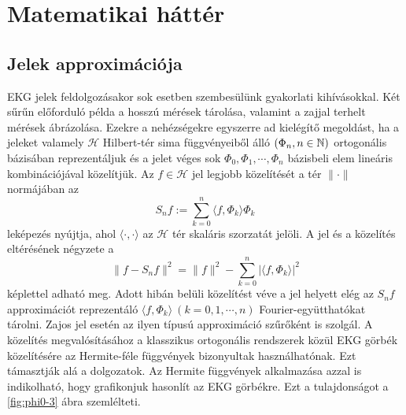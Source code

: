 \documentclass[oneside,titlepage,12pt,a4paper]{report}
\begin{document}
\section{Matematikai háttér}
\subsection{Jelek approximációja}

EKG jelek feldolgozásakor sok esetben szembesülünk gyakorlati kihívásokkal. Két sűrűn előforduló példa a hosszú mérések tárolása, valamint a zajjal terhelt mérések ábrázolása. Ezekre a nehézségekre egyszerre ad kielégítő megoldást, ha a jeleket  valamely $\mathcal H$ Hilbert-tér sima függvényeiből álló $(\Phi_n, n\in\Bbb N)$ ortogonális bázisában reprezentáljuk és a jelet véges sok $\Phi_0,\Phi_1,\cdots,\Phi_n$ bázisbeli elem lineáris kombinációjával közelítjük. Az $f\in\mathcal H$ jel
legjobb közelítését a tér $\|\cdot\|$ normájában az
$$
S_nf:=\sum_{k=0}^n\langle f,\Phi_k\rangle \Phi_k
$$
leképezés nyújtja, ahol $\langle\cdot,\cdot\rangle$ az $\mathcal  H$ tér
skaláris szorzatát jelöli. A jel és a közelítés eltérésének négyzete  a
$$
\|f-S_nf\|^2=\|f\|^2-\sum_{k=0}^n|\langle f,\Phi_k\rangle|^2
$$
képlettel adható meg. Adott hibán belüli közelítést véve a jel helyett  elég az
$S_nf$ approximációt reprezentáló  $\langle f,\Phi_k\rangle\ (k=0,1,\cdots, n)$ Fourier-együtthatókat tárolni.  Zajos jel esetén az ilyen típusú approximáció szűrőként is szolgál.  A közelítés megvalósításához a klasszikus ortogonális rendszerek közül  EKG görbék közelítésére  az Hermite-féle függvények bizonyultak használhatónak. Ezt támasztják alá a \cite{origCikk, kvadCikk} dolgozatok. Az  Hermite függvények alkalmazása azzal is indikolható, hogy grafikonjuk hasonlít az EKG görbékre. Ezt a tulajdonságot a \ref{fig:phi0-3} ábra szemlélteti.
\end{document}
